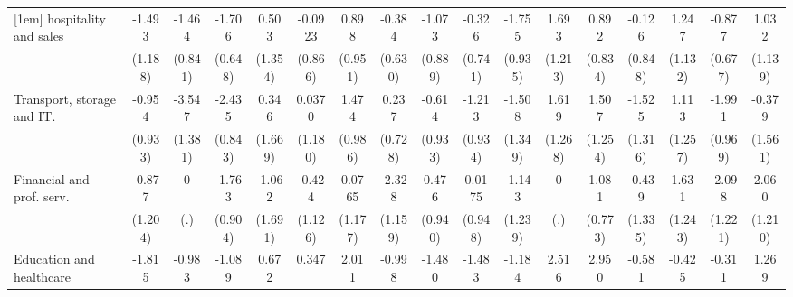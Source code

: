 {\begin{tabular}{l*{16}{c}}
[1em]
hospitality and sales&      -1.493         &      -1.464         &      -1.706\sym{**} &       0.503         &     -0.0923         &       0.898         &      -0.384         &      -1.073         &      -0.326         &      -1.755         &       1.693         &       0.892         &      -0.126         &       1.247         &      -0.877         &       1.032         \\
                    &     (1.188)         &     (0.841)         &     (0.648)         &     (1.354)         &     (0.866)         &     (0.951)         &     (0.630)         &     (0.889)         &     (0.741)         &     (0.935)         &     (1.213)         &     (0.834)         &     (0.848)         &     (1.132)         &     (0.677)         &     (1.139)         \\
[1em]
Transport, storage and IT.&      -0.954         &      -3.547\sym{*}  &      -2.435\sym{**} &       0.346         &      0.0370         &       1.474         &       0.237         &      -0.614         &      -1.213         &      -1.508         &       1.619         &       1.507         &      -1.525         &       1.113         &      -1.991\sym{*}  &      -0.379         \\
                    &     (0.933)         &     (1.381)         &     (0.843)         &     (1.669)         &     (1.180)         &     (0.986)         &     (0.728)         &     (0.933)         &     (0.934)         &     (1.349)         &     (1.268)         &     (1.254)         &     (1.316)         &     (1.257)         &     (0.969)         &     (1.561)         \\
[1em]
Financial and prof. serv.&      -0.877         &           0         &      -1.763         &      -1.062         &      -0.424         &      0.0765         &      -2.328\sym{*}  &       0.476         &      0.0175         &      -1.143         &           0         &       1.081         &      -0.439         &       1.631         &      -2.098         &       2.060         \\
                    &     (1.204)         &         (.)         &     (0.904)         &     (1.691)         &     (1.126)         &     (1.177)         &     (1.159)         &     (0.940)         &     (0.948)         &     (1.239)         &         (.)         &     (0.773)         &     (1.335)         &     (1.243)         &     (1.221)         &     (1.210)         \\
[1em]
Education and healthcare&      -1.815         &      -0.983         &      -1.089         &       0.672         &       0.347         &       2.011\sym{*}  &      -0.998         &      -1.480         &      -1.483         &      -1.184         &       2.516\sym{*}  &       2.950\sym{**} &      -0.581         &      -0.425         &      -0.311         &       1.269         \\

\end{tabular}}
